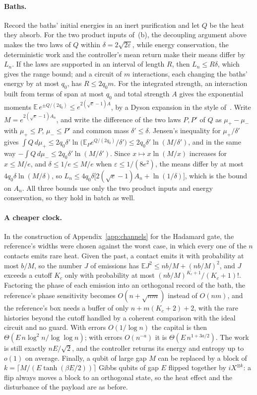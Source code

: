 \paragraph{Baths.} Record the baths' initial energies in an inert purification and let $Q$ be the heat they absorb. For the two product inputs of~(b), the decoupling argument above makes the two laws of $Q$ within $\delta=2\sqrt{2\varepsilon}$, while energy conservation, the deterministic work and the controller's mean return make their means differ by $L_n$. If the laws are supported in an interval of length $R$, then $L_n\le R\delta$, which gives the range bound; and a circuit of $m$ interactions, each changing the baths' energy by at most $q_0$, has $R\le2q_0m$. For the integrated strength, an interaction built from terms of span at most $q_0$ and total strength $A$ gives the exponential moments $\mathbb E\,e^{\pm Q/(2q_0)}\le e^{2(\sqrt e-1)A}$, by a Dyson expansion in the style of~\cite{AKL16}. Write $M=e^{2(\sqrt e-1)A_n}$, and write the difference of the two laws $P,P'$ of $Q$ as $\mu_+-\mu_-$ with $\mu_+\le P$, $\mu_-\le P'$ and common mass $\delta'\le\delta$. Jensen's inequality for $\mu_+/\delta'$ gives $\int Q\,d\mu_+\le2q_0\delta'\ln\bigl(\mathbb E_Pe^{Q/(2q_0)}/\delta'\bigr)\le2q_0\delta'\ln(M/\delta')$, and in the same way $-\int Q\,d\mu_-\le2q_0\delta'\ln(M/\delta')$. Since $x\mapsto x\ln(M/x)$ increases for $x\le M/e$, and $\delta\le1/e\le M/e$ when $\varepsilon\le1/(8e^2)$, the means differ by at most $4q_0\delta\ln(M/\delta)$, so $L_n\le4q_0\delta\bigl[2(\sqrt e-1)A_n+\ln(1/\delta)\bigr]$, which is the bound on $A_n$. All three bounds use only the two product inputs and energy conservation, so they hold in batch as well.

\paragraph{A cheaper clock.} In the construction of Appendix~\ref{app:channels} for the Hadamard gate, the reference's widths were chosen against the worst case, in which every one of the $n$ contacts emits rare heat. Given the past, a contact emits it with probability at most $b/M$, so the number $J$ of emissions has $\mathbb EJ^2\le nb/M+(nb/M)^2$, and $J$ exceeds a cutoff $K_c$ only with probability at most $(nb/M)^{K_c+1}/(K_c+1)!$. Factoring the phase of each emission into an orthogonal record of the bath, the reference's phase sensitivity becomes $O(n+\sqrt{nm})$ instead of $O(nm)$, and the reference's box needs a buffer of only $n+m(K_c+2)+2$, with the rare histories beyond the cutoff handled by a coherent comparison with the ideal circuit and no guard. With errors $O(1/\log n)$ the capital is then $\Theta(E\,n\log^2n/\log\log n)$; with errors $O(n^{-a})$ it is $\Theta(E\,n^{1+3a/2})$. The work is still exactly $nE/\sqrt2$, and the controller returns its energy and entropy up to $o(1)$ on average. Finally, a qubit of large gap $M$ can be replaced by a block of $k=\lceil M/(E\tanh(\beta E/2))\rceil$ Gibbs qubits of gap $E$ flipped together by $iX^{\otimes k}$: a flip always moves a block to an orthogonal state, so the heat effect and the disturbance of the payload are as before.



